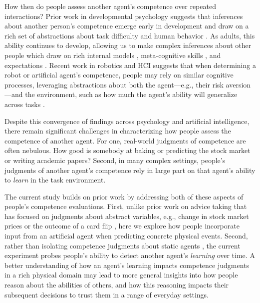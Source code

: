 \documentclass[10pt,letterpaper]{article}
\begin{document}
How then do people assess another agent's competence over repeated interactions? Prior work in developmental psychology suggests that inferences about another person's competence emerge early in development and draw on a rich set of abstractions about task difficulty and human behavior \cite{gweon2021inferential, leonard2019better}. As adults, this ability continues to develop, allowing us to make complex inferences about other people which draw on rich internal models \cite{velez2019integrating, velez2021learning}, meta-cognitive skills \cite{pescetelli2021role}, and expectations \cite{leong2018unrealistic, chang2010seeing}. Recent work in robotics and HCI suggests that when determining a robot or artificial agent's competence, people may rely on similar cognitive processes, leveraging abstractions about both the agent---e.g., their risk aversion \cite{xie2019robot}---and the environment, such as how much the agent's ability will generalize across tasks \cite{soh2020multi}. 

Despite this convergence of findings across psychology and artificial intelligence, there remain significant challenges in characterizing how people assess the competence of another agent. For one, real-world judgments of competence are often nebulous. How good is somebody at baking or predicting the stock market or writing academic papers? Second, in many complex settings, people's judgments of another agent's competence rely in large part on that agent's ability to \textit{learn} in the task environment. 

The current study builds on prior work by addressing both of these aspects of people's competence evaluations. First, unlike prior work on advice taking that has focused on judgments about abstract variables, e.g., change in stock market prices \cite{leong2018unrealistic} or the outcome of a card flip \cite{velez2019integrating}, here we explore how people incorporate input from an artificial agent when predicting concrete physical events. Second, rather than isolating competence judgments about static agents \cite{chen2020trust}, the current experiment probes people's ability to detect another agent's \textit{learning} over time. A better understanding of how an agent's learning impacts competence judgments in a rich physical domain may lead to more general insights into how people reason about the abilities of others, and how this reasoning impacts their subsequent decisions to trust them in a range of everyday settings.
\end{document}
